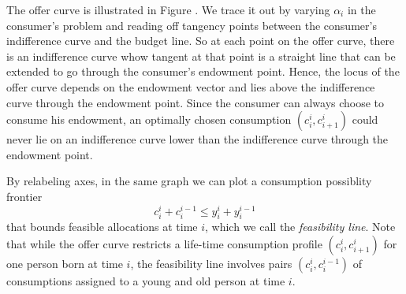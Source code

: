 The offer curve is illustrated in Figure . %
We trace it out by varying $\alpha_i$ in the consumer's problem and
reading off tangency points between the consumer's indifference
curve and the budget line.  
So at each point on the offer curve, there
is an indifference curve whow tangent at
that point  is a straight line that can
be extended to go through the consumer's 
endowment point.
Hence, the locus of the offer curve depends
on the endowment vector and  lies above the 
indifference curve through
the endowment point.  
Since the consumer can always choose to 
consume his endowment, an  optimally
chosen consumption $(c_i^i, c^i_{i+1})$  could 
never lie on an indifference curve lower than 
the indifference curve through the endowment
point. 




By relabeling axes, in the same graph we can plot a consumption possiblity frontier
$$ c_i^i + c_i^{i-1} \leq y_i^i + y_i^{i-1} $$
that bounds feasible allocations at time $i$, which we
call the {\it feasibility line}.  Note that while the offer
curve restricts a life-time consumption
profile $(c_i^i, c_{i+1}^i)$ for one person born at time $i$, the feasibility line involves 
pairs $(c_i^i, c_i^{i-1})$ of consumptions assigned to a young and old person at time $i$.



